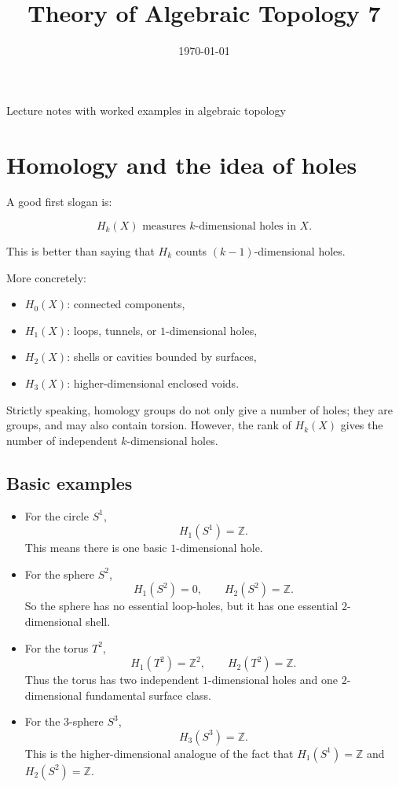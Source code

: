 \documentclass[12pt,a4paper]{article}
\title{\vspace{-1.5em}\bfseries Theory of Algebraic Topology 7}
\author{}
\date{\today}
\theoremstyle{notespace}
\begin{document}
	\maketitle
	\thispagestyle{plain}
		\begin{center}
		\begin{minipage}{0.92\textwidth}
			Lecture notes with worked examples in algebraic topology
		\end{minipage}
	\end{center}
		\tableofcontents
	\clearpage

\section{Homology and the idea of holes}

A good first slogan is:

\[
H_k(X) \text{ measures } k\text{-dimensional holes in } X.
\]

This is better than saying that \(H_k\) counts \((k-1)\)-dimensional holes.

More concretely:

\begin{itemize}
	\item \(H_0(X)\): connected components,
	\item \(H_1(X)\): loops, tunnels, or \(1\)-dimensional holes,
	\item \(H_2(X)\): shells or cavities bounded by surfaces,
	\item \(H_3(X)\): higher-dimensional enclosed voids.
\end{itemize}

Strictly speaking, homology groups do not only give a number of holes; they are groups, and may also contain torsion. However, the rank of \(H_k(X)\) gives the number of independent \(k\)-dimensional holes.

\subsection{Basic examples}

\begin{itemize}
	\item For the circle \(S^1\),
	\[
	H_1(S^1)=\mathbb Z.
	\]
	This means there is one basic \(1\)-dimensional hole.
	
	\item For the sphere \(S^2\),
	\[
	H_1(S^2)=0,
	\qquad
	H_2(S^2)=\mathbb Z.
	\]
	So the sphere has no essential loop-holes, but it has one essential \(2\)-dimensional shell.
	
	\item For the torus \(T^2\),
	\[
	H_1(T^2)=\mathbb Z^2,
	\qquad
	H_2(T^2)=\mathbb Z.
	\]
	Thus the torus has two independent \(1\)-dimensional holes and one \(2\)-dimensional fundamental surface class.
	
	\item For the \(3\)-sphere \(S^3\),
	\[
	H_3(S^3)=\mathbb Z.
	\]
	This is the higher-dimensional analogue of the fact that \(H_1(S^1)=\mathbb Z\) and \(H_2(S^2)=\mathbb Z\).
\end{itemize}
\end{document}

